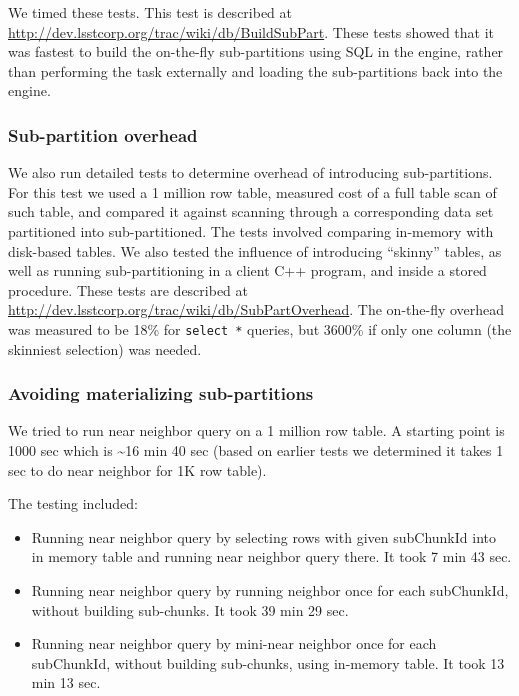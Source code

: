 \documentclass[DM,lsstdraft,toc]{lsstdoc}
\begin{document}
We timed these tests. This test is described at
\url{http://dev.lsstcorp.org/trac/wiki/db/BuildSubPart}. These tests
showed that it was fastest to build the on-the-fly sub-partitions using
SQL in the engine, rather than performing the task externally and
loading the sub-partitions back into the engine.

\subsubsection{Sub-partition overhead}\label{sub-partition-overhead}

We also run detailed tests to determine overhead of introducing
sub-partitions. For this test we used a 1 million row table, measured
cost of a full table scan of such table, and compared it against
scanning through a corresponding data set partitioned into
sub-partitioned. The tests involved comparing in-memory with disk-based
tables. We also tested the influence of introducing ``skinny'' tables,
as well as running sub-partitioning in a client C++ program, and inside
a stored procedure. These tests are described at
\url{http://dev.lsstcorp.org/trac/wiki/db/SubPartOverhead}. The
on-the-fly overhead was measured to be 18\% for \texttt{select\ *}
queries, but 3600\% if only one column (the skinniest selection) was
needed.

\subsubsection{Avoiding materializing
sub-partitions}\label{avoiding-materializing-sub-partitions}

We tried to run near neighbor query on a 1 million row table. A starting
point is 1000 sec which is \textasciitilde{}16 min 40 sec (based on
earlier tests we determined it takes 1 sec to do near neighbor for 1K
row table).

The testing included:

\begin{itemize}
\item
  Running near neighbor query by selecting rows with given subChunkId
  into in memory table and running near neighbor query there. It took 7
  min 43 sec.
\item
  Running near neighbor query by running neighbor once for each
  subChunkId, without building sub-chunks. It took 39 min 29 sec.
\item
  Running near neighbor query by mini-near neighbor once for each
  subChunkId, without building sub-chunks, using in-memory table. It
  took 13 min 13 sec.
\end{itemize}
\end{document}
